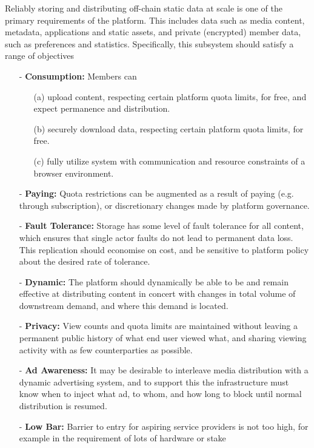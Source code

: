 \documentclass{article}
\begin{document}
Reliably storing and distributing off-chain static data at scale is one of the primary requirements of the platform. This includes data such as media content, metadata, applications and static assets, and private (encrypted) member data, such as preferences and statistics. Specifically, this subsystem should satisfy a range of objectives

\begin{itemize}
  \item[-] \textbf{Consumption:} Members can

  \begin{itemize}
      \item[(a)] upload content, respecting certain platform quota limits, for free, and expect permanence and distribution.

      \item[(b)] securely download data, respecting certain platform quota limits, for free.

      \item[(c)] fully utilize system with communication and resource constraints of a browser environment.

  \end{itemize}

  \item[-] \textbf{Paying:} Quota restrictions can be augmented as a result of paying (e.g. through subscription), or discretionary changes made by platform governance.

  \item[-] \textbf{Fault Tolerance:} Storage has some level of fault tolerance for all content, which ensures that single actor faults do not lead to permanent data loss. This replication should economise on cost, and be sensitive to platform policy about the desired rate of tolerance.

  \item[-] \textbf{Dynamic:} The platform should dynamically be able to be and remain effective at distributing content in concert with changes in total volume of downstream demand, and where this demand is located.

  \item[-] \textbf{Privacy:} View counts and quota limits are maintained without leaving a permanent public history of what end user viewed what, and sharing viewing activity with as few counterparties as possible.

  \item[-] \textbf{Ad Awareness:} It may be desirable to interleave media distribution with a dynamic advertising system, and to support this the infrastructure must know when to inject what ad, to whom, and how long to block until normal distribution is resumed.

  \item[-] \textbf{Low Bar:} Barrier to entry for aspiring service providers is not too high, for example in the requirement of lots of hardware or stake

\end{itemize}
\end{document}
